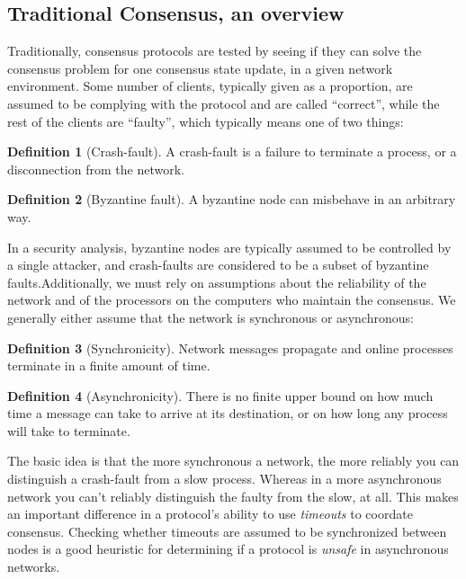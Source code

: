 \documentclass[11pt,a4paper]{article}
\theoremstyle{plain}
\theoremstyle{definition}
\newtheorem{defn}{Definition}
\begin{document}
\subsection{Traditional Consensus, an overview}

Traditionally, consensus protocols are tested by seeing if they can solve the consensus problem for one consensus state update, in a given network environment. Some number of clients, typically given as a proportion, are assumed to be complying with the protocol and are called ``correct'', while the rest of the clients are ``faulty'', which typically means one of two things:

\begin{defn}[Crash-fault]
A crash-fault is a failure to terminate a process, or a disconnection from the network.
\end{defn}

\begin{defn}[Byzantine fault]
A byzantine node can misbehave in an arbitrary way. 
\end{defn}

In a security analysis, byzantine nodes are typically assumed to be controlled by a single attacker, and crash-faults are considered to be a subset of byzantine faults.Additionally, we must rely on assumptions about the reliability of the network and of the processors on the computers who maintain the consensus. We generally either assume that the network is synchronous or asynchronous: 

\begin{defn}[Synchronicity]
Network messages propagate and online processes terminate in a finite amount of time.
\end{defn}

\begin{defn}[Asynchronicity]
There is no finite upper bound on how much time a message can take to arrive at its destination, or on how long any process will take to terminate. 
\end{defn}

The basic idea is that the more synchronous a network, the more reliably you can distinguish a crash-fault from a slow process. Whereas in a more asynchronous network you can't reliably distinguish the faulty from the slow, at all. This makes an important difference in a protocol's ability to use \emph{timeouts} to coordate consensus. Checking whether timeouts are assumed to be synchronized between nodes is a good heuristic for determining if a protocol is \emph{unsafe} in asynchronous networks. 
\end{document}
